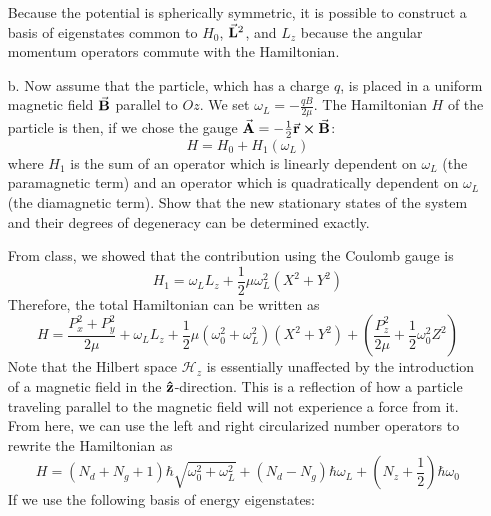 \documentclass[a4paper,twoside]{article}
\begin{document}
\begin{itemize}
\begin{problem}
            Because the potential is spherically symmetric, it is possible to construct a basis of eigenstates common to $ H_0 $, $ \va{L}^2 $, and $ L_z $ because the angular momentum operators commute with the Hamiltonian.
        \end{problem}
    \item[b.] Now assume that the particle, which has a charge $ q $, is placed in a uniform magnetic field $ \va{B} $ parallel to $ Oz $. We set $ \omega_L = - \frac{qB}{2 \mu} $. The Hamiltonian $ H $ of the particle is then, if we chose the gauge $ \va{A} = - \frac{1}{2} \va{r} \cross \va{B} $:
        \begin{equation}
            H = H_0 + H_1(\omega_L)
        \end{equation}
        where $ H_1 $ is the sum of an operator which is linearly dependent on $ \omega_L $ (the paramagnetic term) and an operator which is quadratically dependent on $ \omega_L $ (the diamagnetic term). Show that the new stationary states of the system and their degrees of degeneracy can be determined exactly.
        \begin{problem}
            From class, we showed that the contribution using the Coulomb gauge is
            \begin{equation}
                H_1 = \omega_L L_z + \frac{1}{2} \mu \omega_L^2 \left( X^2 + Y^2 \right)
            \end{equation}
            Therefore, the total Hamiltonian can be written as
            \begin{equation}
                H = \frac{P_x^2 + P_y^2}{2 \mu} + \omega_L L_z + \frac{1}{2} \mu (\omega_0^2 + \omega_L^2)\left( X^2 + Y^2 \right) + \left( \frac{P_z^2}{2 \mu} + \frac{1}{2} \omega_0^2 Z^2 \right)
            \end{equation}
            Note that the Hilbert space $ \mathcal{H}_z $ is essentially unaffected by the introduction of a magnetic field in the $ \vu{z} $-direction. This is a reflection of how a particle traveling parallel to the magnetic field will not experience a force from it. From here, we can use the left and right circularized number operators to rewrite the Hamiltonian as
            \begin{equation}
                H = (N_d + N_g + 1) \hbar \sqrt{\omega_0^2 + \omega_L^2} + (N_d - N_g) \hbar \omega_L + \left( N_z + \frac{1}{2} \right) \hbar \omega_0
            \end{equation}
            If we use the following basis of energy eigenstates:
            \begin{equation}

\end{equation}
\end{problem}
\end{itemize}
\end{document}
